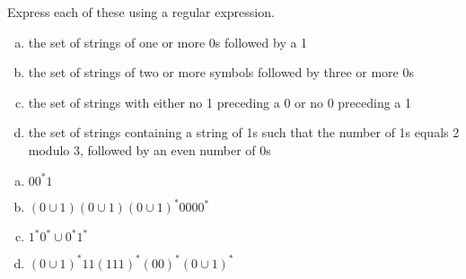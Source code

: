 \documentclass[../main.tex]{subfiles}
\begin{document}
Express each of these using a regular expression.
\begin{enumerate}[a)]
	\item the set of strings of one or more 0s followed by a 1
	\item the set of strings of two or more symbols followed by three or more 0s
	\item the set of strings with either no 1 preceding a 0 or no 0 preceding a 1
	\item the set of strings containing a string of 1s such that the number of 1s equals 2 modulo 3, followed by an even number of 0s
\end{enumerate}

\solution
\begin{enumerate}[a)]
	\item $00^\ast1$ 
	\item $(0 \cup 1)(0 \cup 1)(0 \cup 1)^\ast0000^\ast$
	\item $1^\ast0^\ast \cup 0^\ast1^\ast$
	\item $(0 \cup 1)^\ast 11(111)^\ast(00)^\ast(0 \cup 1)^\ast$
\end{enumerate}
\end{document}
